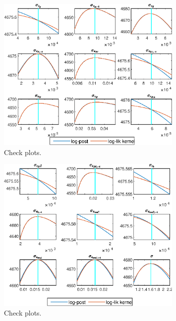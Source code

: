  
\begin{figure}[H]
\centering 
\includegraphics[width=0.80\textwidth]{BRS_sectoral/graphs/BRS_sectoral_CheckPlots1}
\caption{Check plots.}\label{Fig:CheckPlots:1}
\end{figure}
 
\begin{figure}[H]
\centering 
\includegraphics[width=0.80\textwidth]{BRS_sectoral/graphs/BRS_sectoral_CheckPlots2}
\caption{Check plots.}\label{Fig:CheckPlots:2}
\end{figure}
 
